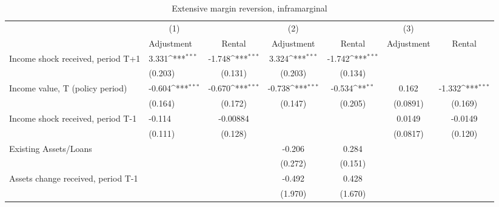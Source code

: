 \begin{table}[htbp]\centering
\def\sym#1{\ifmmode^{#1}\else\(^{#1}\)\fi}
\caption{Extensive margin reversion, inframarginal}
\begin{tabular}{p{0.8in}l*{5}{c}}
\hline\hline
                    &\multicolumn{1}{c}{(1)}         &                    &\multicolumn{1}{c}{(2)}         &                     &\multicolumn{1}{c}{(3)}         &                     \\
                    &  Adjustment         &      Rental         &  Adjustment         &      Rental         &  Adjustment         &      Rental         \\
\hline
Income shock received, period T+1&       3.331\sym{***}&      -1.748\sym{***}&       3.324\sym{***}&      -1.742\sym{***}&                     &                     \\
                    &     (0.203)         &     (0.131)         &     (0.203)         &     (0.134)         &                     &                     \\
Income value, T (policy period)&      -0.604\sym{***}&      -0.670\sym{***}&      -0.738\sym{***}&      -0.534\sym{**} &       0.162         &      -1.332\sym{***}\\
                    &     (0.164)         &     (0.172)         &     (0.147)         &     (0.205)         &    (0.0891)         &     (0.169)         \\
Income shock received, period T-1&      -0.114         &    -0.00884         &                     &                     &      0.0149         &     -0.0149         \\
                    &     (0.111)         &     (0.128)         &                     &                     &    (0.0817)         &     (0.120)         \\
Existing Assets/Loans&                     &                     &      -0.206         &       0.284         &                     &                     \\
                    &                     &                     &     (0.272)         &     (0.151)         &                     &                     \\
Assets change received, period T-1&                     &                     &      -0.492         &       0.428         &                     &                     \\
                    &                     &                     &     (1.970)         &     (1.670)         &                     &                     \\

\end{tabular}
\end{table}
